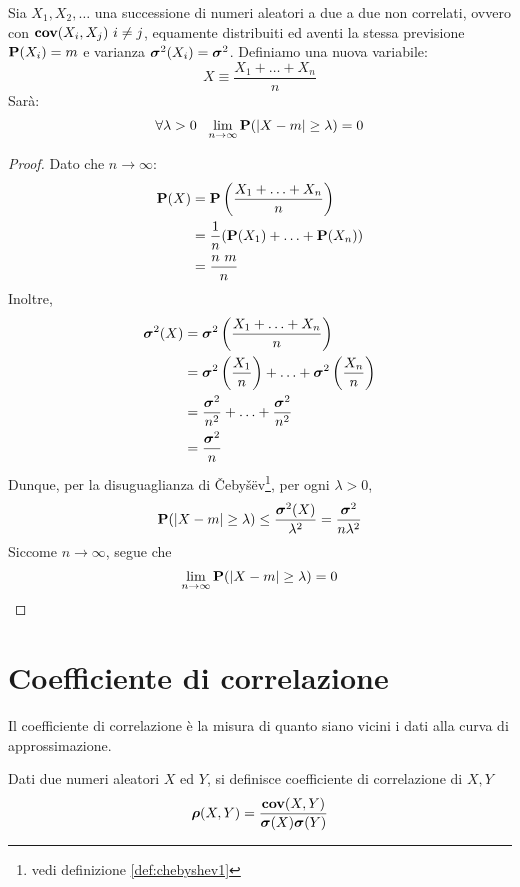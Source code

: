 \begin{theorem}\label{thm:teorema_bernoulli}
  Sia \( X_1,X_2, \ldots \) una successione di numeri aleatori a due a due non correlati, ovvero con \( \mathbf{cov}(X_i, X_j) ~ i \ne j \), equamente distribuiti ed aventi la stessa previsione \( \mathbf{P}(X_i) = m \) e varianza \( \boldsymbol\sigma^2(X_i) = \boldsymbol\sigma^2 \).
  Definiamo una nuova variabile:
  \[ X \equiv \frac{X_1 + \ldots + X_n}{n} \]
  Sarà:
  \[ \forall \lambda > 0 ~~ \lim_{n \rightarrow \infty} \mathbf{P}(|X - m| \ge \lambda) = 0 \]
\end{theorem}

\begin{proof}
  Dato che \( n \rightarrow \infty \):
  \begin{align*}
    \mathbf{P}(X) &= \mathbf{P} \left( \frac{X_1 + \ldots + X_n}{n} \right) \\
    &= \frac{1}{n} (\mathbf{P}(X_1) + \ldots + \mathbf{P}(X_n)) \\
    &= \frac{n~m}{n}
  \end{align*}
  Inoltre,
  \begin{align*}
    \boldsymbol\sigma^2(X) &= \boldsymbol\sigma^2 \left( \frac{X_1 + \ldots + X_n}{n} \right) \\
    &= \boldsymbol\sigma^2 \left( \frac{X_1}{n} \right) + \ldots + \boldsymbol\sigma^2 \left( \frac{X_n}{n} \right) \\
    &= \frac{\boldsymbol\sigma^2}{n^2} + \ldots + \frac{\boldsymbol\sigma^2}{n^2} \\
    &= \frac{\boldsymbol\sigma^2}{n}
  \end{align*}
  Dunque, per la disuguaglianza di Čebyšëv\footnote{vedi definizione \ref{def:chebyshev1}}, per ogni \( \lambda > 0 \),
  \[ \mathbf{P}(|X - m| \ge \lambda) \le \frac{\boldsymbol\sigma^2(X)}{\lambda^2} = \frac{\boldsymbol\sigma^2}{n \lambda^2} \]
  Siccome \( n \rightarrow \infty \), segue che
  \[ \lim_{n \rightarrow \infty} \mathbf{P}(|X - m| \ge \lambda) = 0 \]
\end{proof}

\section{Coefficiente di correlazione}
Il coefficiente di correlazione è la misura di quanto siano vicini i dati alla curva di approssimazione.

\begin{definition}
  Dati due numeri aleatori $X$ ed $Y$, si definisce coefficiente di correlazione di $X,Y$
  \[ \boldsymbol\rho(X,Y) = \frac{\mathbf{cov}(X,Y)}{\boldsymbol\sigma(X)\boldsymbol\sigma(Y)} \]
\end{definition}

